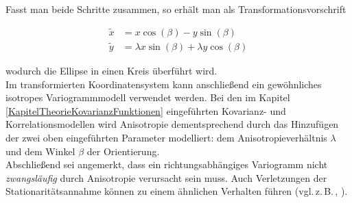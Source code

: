 Fasst man beide Schritte zusammen, so erhält man als
Transformationsvorschrift

\begin{equation}
\begin{aligned}
\tilde{x}
&=
x\cos(\beta) - y\sin(\beta)\\
\tilde{y}
&=
\lambda x\sin(\beta) +\lambda y\cos(\beta)
\end{aligned}
\end{equation}

wodurch die Ellipse in einen Kreis überführt wird.\\

Im transformierten Koordinatensystem kann anschließend 
ein gewöhnliches isotropes Variogrammmodell verwendet werden.
Bei den im Kapitel \ref{KapitelTheorieKovarianzFunktionen}
eingeführten Kovarianz- und Korrelationsmodellen 
wird Anisotropie dementsprechend durch das Hinzufügen der zwei 
oben eingeführten Parameter modelliert: dem Anisotropieverhältnis
$\lambda$ und dem Winkel $\beta$ der Orientierung. \\

Abschließend sei angemerkt, dass ein richtungsabhängiges 
Variogramm nicht \textit{zwangsläufig} durch Anisotropie verursacht 
sein muss. Auch Verletzungen der Stationaritätsannahme können zu 
einem ähnlichen Verhalten führen (vgl.\,z.\,B.\,\cite[Kap.\,3.7]{Montero2015},
\cite[Kap.\,5]{Kitanidis1997}).